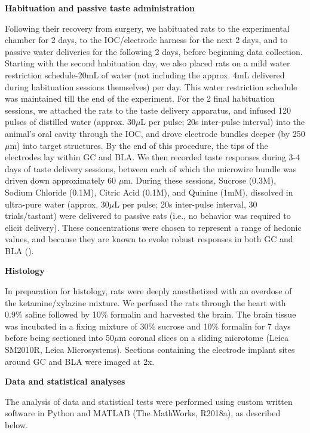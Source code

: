 \begin{refsection}
\smallskip
\noindent\textbf{Habituation and passive taste administration}\par
\noindent Following their recovery from surgery, we habituated rats to the experimental chamber for 2 days, to the IOC/electrode harness for the next 2 days, and to passive water deliveries for the following 2 days, before beginning data collection. Starting with the second habituation day, we also placed rats on a mild water restriction schedule-20mL of water (not including the approx. 4mL delivered during habituation sessions themselves) per day. This water restriction schedule was maintained till the end of the experiment. For the 2 final habituation sessions, we attached the rats to the taste delivery apparatus, and infused 120 pulses of distilled water (approx. 30$\mu$L per pulse; 20s inter-pulse interval) into the animal’s oral cavity through the IOC, and drove electrode bundles deeper (by 250 $\mu$m) into target structures. By the end of this procedure, the tips of the electrodes lay within GC and BLA. We then recorded taste responses during 3-4 days of taste delivery sessions, between each of which the microwire bundle was driven down approximately 60 $\mu$m. During these sessions, Sucrose (0.3M), Sodium Chloride (0.1M), Citric Acid (0.1M), and Quinine (1mM), dissolved in ultra-pure water (approx. 30$\mu$L per pulse; 20s inter-pulse interval, 30 trials/tastant) were delivered to passive rats (i.e., no behavior was required to elicit delivery). These concentrations were chosen to represent a range of hedonic values, and because they are known to evoke robust responses in both GC and BLA (\cite{fontanini2009a,sadacca2012a}).

\smallskip
\noindent\textbf{Histology}\par
\noindent In preparation for histology, rats were deeply anesthetized with an overdose of the ketamine/xylazine mixture. We perfused the rats through the heart with 0.9\% saline followed by 10\% formalin and harvested the brain. The brain tissue was incubated in a fixing mixture of 30\% sucrose and 10\% formalin for 7 days before being sectioned into 50$\mu$m coronal slices on a sliding microtome (Leica SM2010R, Leica Microsystems). Sections containing the electrode implant sites around GC and BLA were imaged at 2x.

\smallskip
\noindent\textbf{Data and statistical analyses}\par
\noindent The analysis of data and statistical tests were performed using custom written software in Python and MATLAB (The MathWorks, R2018a), as described below.


\end{refsection}
